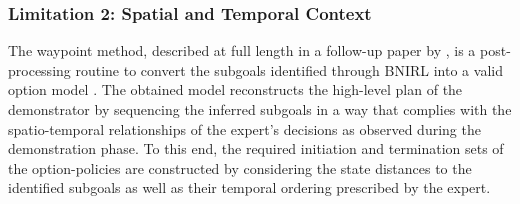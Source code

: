 \documentclass[twoside,11pt]{article}
\begin{document}
\subsubsection*{Limitation 2: Spatial and Temporal Context} 
\label{phantom:lim2}
The waypoint method, described at full length in a follow-up paper %
by \citet{michini2015bayesian}, is a post-processing routine %
to convert the subgoals %
identified through BNIRL into a valid option model \citep{sutton1999between}. The obtained model reconstructs the high-level plan of the demonstrator by sequencing the inferred subgoals in a way that %
complies with the spatio-temporal relationships of the expert's decisions as observed %
during the demonstration phase. %
To this end, the required initiation and termination sets of the option-policies are constructed %
by considering the state distances to the identified 
subgoals as well as their %
temporal ordering %
prescribed by the expert.
%
\end{document}
